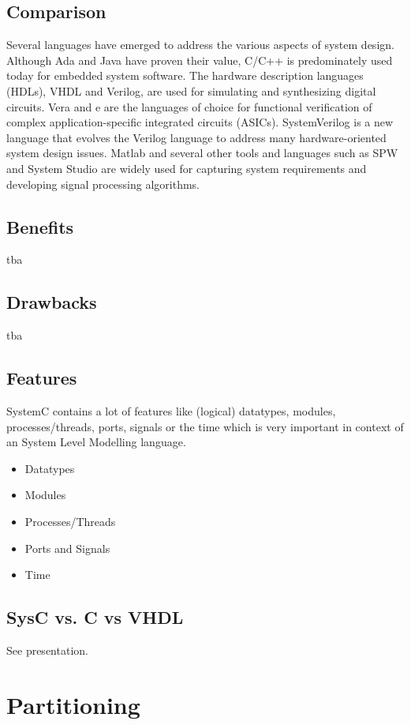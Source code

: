 \documentclass{article}
\begin{document}
		\subsection{Comparison}
		Several languages have emerged to address the various aspects of system design. Although Ada and Java have proven their value, C/C++ is predominately used today for embedded system software. The hardware description languages (HDLs), VHDL and Verilog, are used for simulating and synthesizing digital circuits. Vera and e are the languages of choice for functional verification of complex application-specific integrated circuits (ASICs). SystemVerilog is a new language that evolves the Verilog language to address many hardware-oriented system design issues. Matlab and several other tools and languages such as SPW and System Studio are widely used for capturing system requirements and developing signal processing algorithms.
		
	  \subsection{Benefits}
	  
	  tba
	  
	  \subsection{Drawbacks}
	  
	  tba
	  
	  \subsection{Features}
	  SystemC contains a lot of features like (logical) datatypes, modules, processes/threads, ports, signals or the time which is very important in context of an System Level Modelling language.
	   \begin{itemize}
 	    \item{Datatypes}
 	    \item{Modules}
 	    \item{Processes/Threads}
 	    \item{Ports and Signals}
  	    \item{Time}
	   \end{itemize}
	  \subsection{SysC vs. C vs VHDL}
	  See presentation.
	\section{Partitioning}
\end{document}
